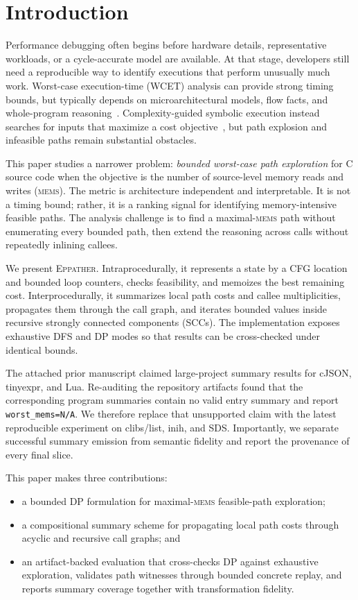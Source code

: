 \documentclass[10pt,conference]{IEEEtran}
\newcommand{\mems}{\textsc{mems}\xspace}
\newcommand{\tool}{\textsc{Eppather}\xspace}
\newcommand{\code}[1]{\texttt{#1}}
\begin{document}
\section{Introduction}
Performance debugging often begins before hardware details, representative workloads, or a cycle-accurate model are available. At that stage, developers still need a reproducible way to identify executions that perform unusually much work. Worst-case execution-time (WCET) analysis can provide strong timing bounds, but typically depends on microarchitectural models, flow facts, and whole-program reasoning~\cite{wilhelm2008wcet,li1995ipet}. Complexity-guided symbolic execution instead searches for inputs that maximize a cost objective~\cite{burnim2009wcec}, but path explosion and infeasible paths remain substantial obstacles.

This paper studies a narrower problem: \emph{bounded worst-case path exploration} for C source code when the objective is the number of source-level memory reads and writes (\mems). The metric is architecture independent and interpretable. It is not a timing bound; rather, it is a ranking signal for identifying memory-intensive feasible paths. The analysis challenge is to find a maximal-\mems path without enumerating every bounded path, then extend the reasoning across calls without repeatedly inlining callees.

We present \tool. Intraprocedurally, it represents a state by a CFG location and bounded loop counters, checks feasibility, and memoizes the best remaining cost. Interprocedurally, it summarizes local path costs and callee multiplicities, propagates them through the call graph, and iterates bounded values inside recursive strongly connected components (SCCs). The implementation exposes exhaustive DFS and DP modes so that results can be cross-checked under identical bounds.

The attached prior manuscript claimed large-project summary results for cJSON, tinyexpr, and Lua. Re-auditing the repository artifacts found that the corresponding program summaries contain no valid entry summary and report \code{worst\_mems=N/A}. We therefore replace that unsupported claim with the latest reproducible experiment on clibs/list, inih, and SDS. Importantly, we separate successful summary emission from semantic fidelity and report the provenance of every final slice.

This paper makes three contributions:
\begin{itemize}
  \item a bounded DP formulation for maximal-\mems feasible-path exploration;
  \item a compositional summary scheme for propagating local path costs through acyclic and recursive call graphs; and
  \item an artifact-backed evaluation that cross-checks DP against exhaustive exploration, validates path witnesses through bounded concrete replay, and reports summary coverage together with transformation fidelity.
\end{itemize}
\end{document}
